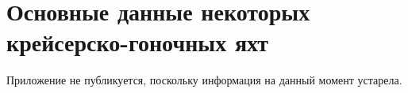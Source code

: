 \chapter{Основные данные некоторых крейсерско-гоночных яхт}\label{app:1}

Приложение не публикуется, поскольку информация на данный момент устарела.
